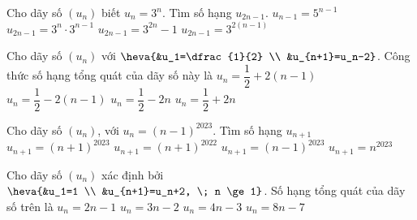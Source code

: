 \begin{ex}%
	Cho dãy số  $(u_n)$ biết $u_n=3^n$. Tìm số hạng $u_{2n-1}$.
	 \choice
		{$u_{n-1}=5^{n-1}$} 
		{\True $u_{2n-1}=3^n \cdot  3^{n-1}$}
		 {$u_{2n-1}= 3^{2n}-1$}
		 {$u_{2n-1}=3^{2(n-1)}$}
\end{ex}

\begin{ex}%
	Cho  dãy số \((u_n)\) với $\heva{&u_1=\dfrac{1}{2} \\ &u_{n+1}=u_n-2}$. Công thức số hạng tổng quát của dãy số này là
	 \choice
		{$u_n=\dfrac{1}{2}+2(n-1)$} 
		{\True $u_n=\dfrac{1}{2}-2(n-1)$} 
		 {$u_n=\dfrac{1}{2}-2n$}
		{$u_n=\dfrac{1}{2}+2n$} 
\end{ex}

\begin{ex}%
	 Cho dãy số $(u_n)$, với $u_n=(n-1)^{2023}$. Tìm số hạng $u_{n+1}$
	 \choice
		 {$u_{n+1}=(n+1)^{2023}$}
		{$u_{n+1}=(n+1)^{2022}$} 
		 {$u_{n+1}=(n-1)^{2023}$}
		{\True  $u_{n+1}=n^{2023}$}
\end{ex}

\begin{ex}%
	Cho dãy số $(u_n)$ xác định bởi $\heva{&u_1=1 \\  &u_{n+1}=u_n+2, \; n \ge 1}$. Số hạng tổng quát của dãy số trên là
	\choice 
		 {\True $u_n=2n-1$}
		 {$u_n=3n-2$}
		 {$u_n=4n-3$}
		{$u_n=8n-7$} 
\end{ex}

